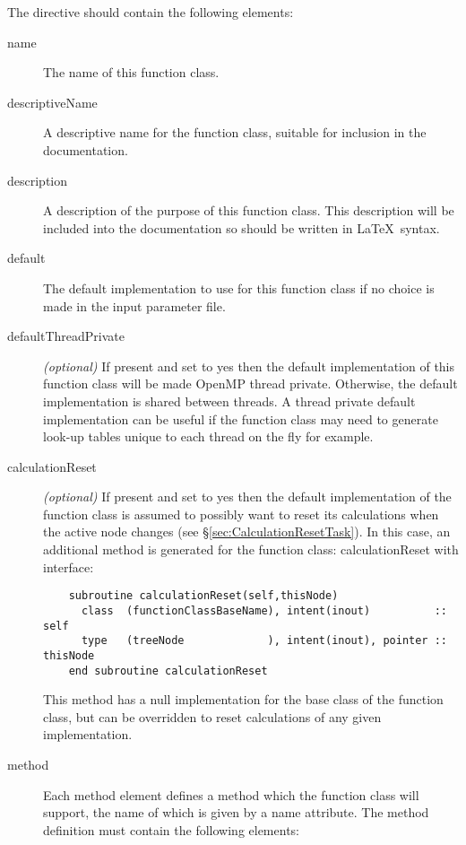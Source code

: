 The directive should contain the following elements:
\begin{description}
\item[{\normalfont \ttfamily name}] The name of this function class.
\item[{\normalfont \ttfamily descriptiveName}] A descriptive name for the function class, suitable for inclusion in the documentation.
\item[{\normalfont \ttfamily description}] A description of the purpose of this function class. This description will be included into the documentation so should be written in \LaTeX\ syntax.
\item[{\normalfont \ttfamily default}] The default implementation to use for this function class if no choice is made in the input parameter file.
\item[{\normalfont \ttfamily defaultThreadPrivate}] \emph{(optional)} If present and set to {\normalfont \ttfamily yes} then the default implementation of this function class will be made OpenMP thread private. Otherwise, the default implementation is shared between threads. A thread private default implementation can be useful if the function class may need to generate look-up tables unique to each thread on the fly for example.
\item[{\normalfont \ttfamily calculationReset}] \emph{(optional)} If present and set to {\normalfont \ttfamily yes} then the default implementation of the function class is assumed to possibly want to reset its calculations when the active \gls{node} changes (see \S\ref{sec:CalculationResetTask}). In this case, an additional method is generated for the function class: {\normalfont \ttfamily calculationReset} with interface:
  \begin{lstlisting}
    subroutine calculationReset(self,thisNode)
      class  (functionClassBaseName), intent(inout)          :: self
      type   (treeNode             ), intent(inout), pointer :: thisNode
    end subroutine calculationReset
  \end{lstlisting}
  This method has a null implementation for the base class of the function class, but can be overridden to reset calculations of any given implementation.
\item[{\normalfont \ttfamily method}] Each {\normalfont \ttfamily method} element defines a method which the function class will support, the name of which is given by a {\normalfont \ttfamily name} attribute. The method definition must contain the following elements:
  \begin{description}

\end{description}
\end{description}
